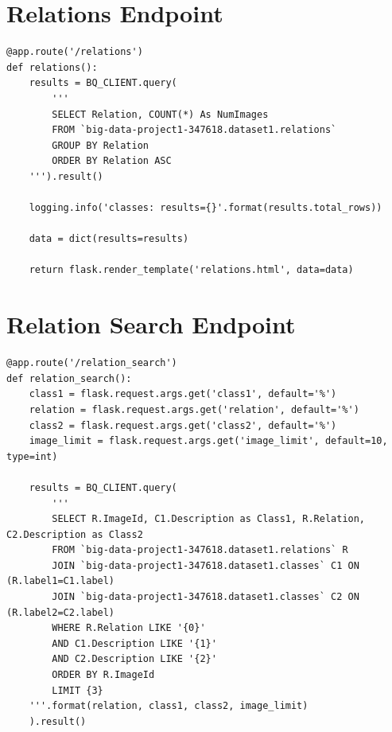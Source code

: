 \documentclass[a4paper, 11pt]{article}
\newenvironment{code}{\captionsetup{type=listing}}{}
\begin{document}
\begin{appendix}
\section{Relations Endpoint}

\hspace{0pt}
\vfill

\begin{code}
\begin{verbatim}
@app.route('/relations')
def relations():
    results = BQ_CLIENT.query(
        '''
        SELECT Relation, COUNT(*) As NumImages
        FROM `big-data-project1-347618.dataset1.relations`
        GROUP BY Relation
        ORDER BY Relation ASC
    ''').result()

    logging.info('classes: results={}'.format(results.total_rows))
    
    data = dict(results=results)
    
    return flask.render_template('relations.html', data=data)
\end{verbatim}
\label{code:relations}
\end{code}

\vfill
\hspace{0pt}

\pagebreak

\section{Relation Search Endpoint}

\begin{code}
\begin{verbatim}
@app.route('/relation_search')
def relation_search():
    class1 = flask.request.args.get('class1', default='%')
    relation = flask.request.args.get('relation', default='%')
    class2 = flask.request.args.get('class2', default='%')
    image_limit = flask.request.args.get('image_limit', default=10, type=int)

    results = BQ_CLIENT.query(
        '''
        SELECT R.ImageId, C1.Description as Class1, R.Relation, C2.Description as Class2
        FROM `big-data-project1-347618.dataset1.relations` R
        JOIN `big-data-project1-347618.dataset1.classes` C1 ON (R.label1=C1.label)
        JOIN `big-data-project1-347618.dataset1.classes` C2 ON (R.label2=C2.label)
        WHERE R.Relation LIKE '{0}'
        AND C1.Description LIKE '{1}'
        AND C2.Description LIKE '{2}'
        ORDER BY R.ImageId
        LIMIT {3}
    '''.format(relation, class1, class2, image_limit)
    ).result()


\end{verbatim}
\end{code}
\end{appendix}
\end{document}

